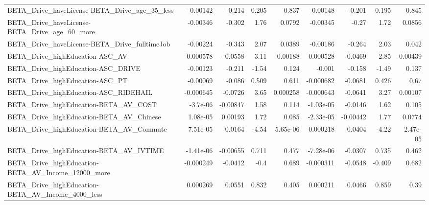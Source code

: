 \begin{tabular}{lrrrrrrrr}
BETA\_Drive\_haveLicense-BETA\_Drive\_age\_35\_less      &    -0.00142 &       -0.214 &     0.205 &    0.837 &   -0.00148 &      -0.201 &        0.195 &         0.845 \\
BETA\_Drive\_haveLicense-BETA\_Drive\_age\_60\_more      &    -0.00346 &       -0.302 &      1.76 &   0.0792 &   -0.00345 &       -0.27 &         1.72 &        0.0856 \\
BETA\_Drive\_haveLicense-BETA\_Drive\_fulltimeJob      &    -0.00224 &       -0.343 &      2.07 &   0.0389 &   -0.00186 &      -0.264 &         2.03 &         0.042 \\
BETA\_Drive\_highEducation-ASC\_AV                    &   -0.000578 &      -0.0558 &      3.11 &  0.00188 &  -0.000528 &     -0.0469 &         2.85 &       0.00439 \\
BETA\_Drive\_highEducation-ASC\_DRIVE                 &    -0.00123 &       -0.211 &     -1.54 &    0.124 &     -0.001 &      -0.158 &        -1.49 &         0.137 \\
BETA\_Drive\_highEducation-ASC\_PT                    &    -0.00069 &       -0.086 &     0.509 &    0.611 &  -0.000682 &     -0.0681 &        0.426 &          0.67 \\
BETA\_Drive\_highEducation-ASC\_RIDEHAIL              &   -0.000645 &      -0.0726 &      3.65 & 0.000258 &  -0.000643 &     -0.0641 &         3.27 &       0.00107 \\
BETA\_Drive\_highEducation-BETA\_AV\_COST              &    -3.7e-06 &     -0.00847 &      1.58 &    0.114 &  -1.03e-05 &     -0.0146 &         1.62 &         0.105 \\
BETA\_Drive\_highEducation-BETA\_AV\_Chinese           &    1.08e-05 &      0.00193 &      1.72 &    0.085 &  -2.33e-05 &    -0.00442 &         1.77 &        0.0774 \\
BETA\_Drive\_highEducation-BETA\_AV\_Commute           &    7.51e-05 &       0.0164 &     -4.54 & 5.65e-06 &   0.000218 &      0.0404 &        -4.22 &      2.47e-05 \\
BETA\_Drive\_highEducation-BETA\_AV\_IVTIME            &   -1.41e-06 &     -0.00655 &     0.711 &    0.477 &  -7.28e-06 &     -0.0307 &        0.735 &         0.462 \\
BETA\_Drive\_highEducation-BETA\_AV\_Income\_12000\_more &   -0.000249 &      -0.0412 &      -0.4 &    0.689 &  -0.000311 &     -0.0548 &       -0.409 &         0.682 \\
BETA\_Drive\_highEducation-BETA\_AV\_Income\_4000\_less  &    0.000269 &       0.0551 &     0.832 &    0.405 &   0.000211 &      0.0466 &        0.859 &          0.39 \\

\end{tabular}
